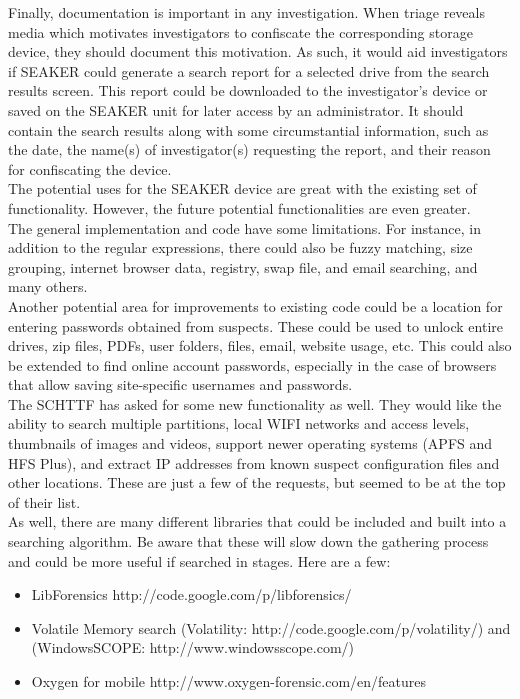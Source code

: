 \documentclass[12pt]{article}
\begin{document}
Finally, documentation is important in any investigation. When triage reveals media which motivates
investigators to confiscate the corresponding storage device, they should document this motivation. As
such, it would aid investigators if SEAKER could generate a search report for a selected drive from
the search results screen. This report could be downloaded to the investigator’s device or saved on the
SEAKER unit for later access by an administrator. It should contain the search results along with some
circumstantial information, such as the date, the name(s) of investigator(s) requesting the report, and
their reason for confiscating the device.\\

The potential uses for the SEAKER device are great with the existing set of
functionality.  However, the future potential functionalities are even greater.\\

The general implementation and code have some limitations.  For instance,
in addition to the regular expressions, there could also be fuzzy matching, size
grouping, internet browser data, registry, swap file, and email searching, and
many others.\\

Another potential area for improvements to existing code could be a location for
entering passwords obtained from suspects.  These could be used to unlock entire
drives, zip files, PDFs, user folders, files, email, website usage, etc.  This
could also be extended to find online account passwords, especially in the case
of browsers that allow saving site-specific usernames and passwords.\\

The SCHTTF has asked for some new functionality as well.  They would like the
ability to search multiple partitions, local WIFI networks and access levels, 
thumbnails of images and videos, support newer operating systems (APFS and
HFS Plus), and extract IP addresses from known suspect configuration files and 
other locations.  These are just a few of the requests, but seemed to be at
the top of their list.\\

As well, there are many different libraries that could be included and built
into a searching algorithm.  Be aware that these will slow down the gathering
process and could be more useful if searched in stages.  Here are a few:

\begin{itemize}
  \item LibForensics http://code.google.com/p/libforensics/
  \item Volatile Memory search (Volatility: http://code.google.com/p/volatility/) and (WindowsSCOPE: http://www.windowsscope.com/)
  \item Oxygen for mobile http://www.oxygen-forensic.com/en/features
\end{itemize}
\end{document}
